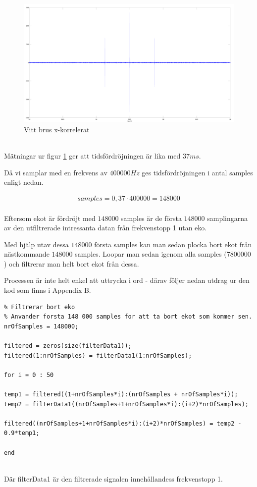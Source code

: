 \documentclass[a4paper,12pt,fleqn]{article}
\begin{document}
\begin{figure}[htp]
  \begin{center}
  \includegraphics[keepaspectratio=true,width=\linewidth]{xCorr.png}  %
  \end{center}
  \caption{Vitt brus x-korrelerat} %
  \label{fig:xCorr}
\end{figure}
~\\
Mätningar ur figur \ref{fig:xCorr} ger att tidsfördröjningen är lika med $37 ms$. 

Då vi samplar med en frekvens av $400 000 Hz$ ges tidsfördröjningen i antal samples enligt nedan. 

\begin{gather}
samples = 0,37 \cdot 400 000 = 148 000
\label{equ:delaySamples}
\end{gather}
~\\
Eftersom ekot är fördröjt med $148 000$ samples är de första $148 000$ samplingarna av den utfiltrerade intressanta datan från frekvenstopp 1 utan eko. 

Med hjälp utav dessa $148 000$ första samples kan man sedan plocka bort ekot från nästkommande $148 000$ samples. Loopar man sedan igenom alla samples ($7 800 000$) och filtrerar man helt bort ekot från dessa. 

Processen är inte helt enkel att uttrycka i ord - därav följer nedan utdrag ur den kod som finns i Appendix B. 

\begin{lstlisting}
% Filtrerar bort eko
% Anvander forsta 148 000 samples for att ta bort ekot som kommer sen.
nrOfSamples = 148000;

filtered = zeros(size(filterData1));
filtered(1:nrOfSamples) = filterData1(1:nrOfSamples);

for i = 0 : 50

temp1 = filtered((1+nrOfSamples*i):(nrOfSamples + nrOfSamples*i));
temp2 = filterData1((nrOfSamples+1+nrOfSamples*i):(i+2)*nrOfSamples);

filtered((nrOfSamples+1+nrOfSamples*i):(i+2)*nrOfSamples) = temp2 - 0.9*temp1;

end
\end{lstlisting}
~\\
Där filterData1 är den filtrerade signalen innehållandess frekvenstopp 1. 
\end{document}
